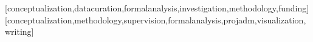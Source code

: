 \documentclass[portuguese]{textolivre}
\begin{document}
\begin{polyabstract}
\begin{english}
\begin{abstract}
\end{abstract}
\end{english}
\end{polyabstract}









\printbibliography\label{sec-bib}
\begin{contributors}
[conceptualization,datacuration,formalanalysis,investigation,methodology,funding]
[conceptualization,methodology,supervision,formalanalysis,projadm,visualization,writing]
\end{contributors}
\end{document}

